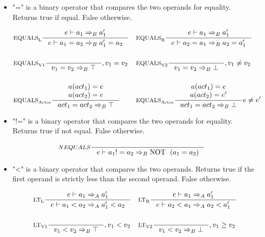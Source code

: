 \begin{itemize}
\item "=" is a binary operator that compares the two operands for equality. Returns true if equal. False otherwise.

\begin{align*}
&\inference[$\text{EQUALS}_\text{L}$]{e \vdash a_1 \Rightarrow_B a_1'}
                    {e \vdash a_1 = a_2 \Rightarrow_B a_1' = a_2}
&
&\inference[$\text{EQUALS}_\text{R}$]{e \vdash a_1 \Rightarrow_B a_1'}
                    {e \vdash a_2 = a_1 \Rightarrow_B a_2 = a_1'}
\\\\
&\inference[$\text{EQUALS}_\text{V1}$]{}
                    {v_1 = v_2 \Rightarrow_B \top}
                    {, v_1 = v_2}
&
&\inference[$\text{EQUALS}_\text{V2}$]{}
                    {v_1 = v_2 \Rightarrow_B \bot}
                    {, v_1 \neq v_2}
\\\\
&\inference[$\text{EQUALS}_\text{Actor}$]{a(act_1) = e\\ a(act_2) = e}
                    {act_1 = act_2 \Rightarrow_B \top}
&
&\inference[$\text{EQUALS}_\text{Actor}$]{a(act_1) = e\\ a(act_2) = e'}
                    {act_1 = act_2 \Rightarrow_B \bot}
                    {e \neq e'}
\end{align*}

\item "!=" is a binary operator that compares the two operands for equality. Returns true if not equal. False otherwise.

\begin{align*}
&\inference[$NEQUALS$]{}
                    {e \vdash a_1 != a_2 \Rightarrow_B \Tnot (a_1 = a_2)}
\end{align*}

\item "<" is a binary operator that compares the two operands. Returns true if the first operand is strictly less than the second operand. False otherwise.

\begin{align*}
&\inference[$\text{LT}_\text{L}$]{e \vdash a_1 \Rightarrow_A a_1'}
                    {e \vdash a_1 < a_2 \Rightarrow_A a_1' < a_2}
&
&\inference[$\text{LT}_\text{R}$]{e \vdash a_1 \Rightarrow_A a_1'}
                    {e \vdash a_2 < a_1 \Rightarrow_A a_2 < a_1'}
\\\\
&\inference[$\text{LT}_\text{V1}$]{}
                    {v_1 < v_2 \Rightarrow_B \top}
                    {, v_1 < v_2}
&
&\inference[$\text{LT}_\text{V2}$]{}
                    {v_1 < v_2 \Rightarrow_B \bot}
                    {, v_1 \geq v_2}
\end{align*}


\end{itemize}
